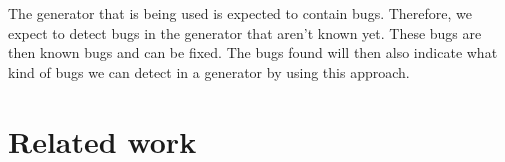 The generator that is being used is expected to contain bugs. Therefore, we
expect to detect bugs in the generator that aren't known yet. These bugs are
then known bugs and can be fixed. The bugs found will then also indicate what
kind of bugs we can detect in a generator by using this approach.


\section{Related work}


